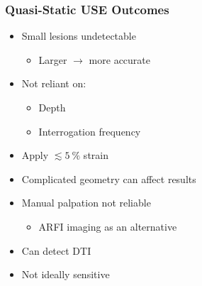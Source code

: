 \documentclass{beamer}
\newcommand{\percent}{\%}
\begin{document}

		\begin{frame}
			\frametitle{Quasi-Static USE Outcomes}
			\begin{itemize}
				\item Small lesions undetectable
				\begin{itemize}
					\item Larger $\rightarrow$ more accurate
				\end{itemize}
				\item Not reliant on:
				\begin{itemize}
					\item Depth
					\item Interrogation frequency
				\end{itemize}
				\item Apply $\lesssim \SI{5}{\percent}$ strain
				\item Complicated geometry can affect results
				\item Manual palpation not reliable
				\begin{itemize}
					\item ARFI imaging as an alternative
				\end{itemize}
				\item \alert{Can detect DTI}
				\item \alert{Not ideally sensitive}
			\end{itemize}
		\end{frame}
\end{document}

